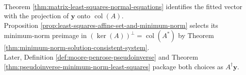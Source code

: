 \begin{perspective} \label{per:least-squares-pseudoinverse-roadmap} \\
Theorem \ref{thm:matrix-least-squares-normal-equations} identifies the fitted vector with the projection of $\mathbf{y}$ onto $\operatorname{col}(A)$.\\
Proposition \ref{prop:least-squares-affine-set-and-minimum-norm} selects its minimum-norm preimage in $(\ker(A))^{\perp}=\operatorname{col}(A^*)$ by Theorem \ref{thm:minimum-norm-solution-consistent-system}.\\
Later, Definition \ref{def:moore-penrose-pseudoinverse} and Theorem \ref{thm:pseudoinverse-minimum-norm-least-squares} package both choices as $A^{\dagger}\mathbf{y}$.
\end{perspective}
